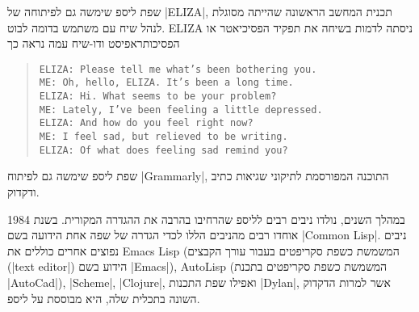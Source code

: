 שפת ליספ שימשה גם לפיתוחה של \E|ELIZA|, תכנית המחשב הראשונה שהייתה מסוגלת לנהל
שיח עם משתמש בדומה לבוט. ELIZA ניסתה לדמות בשיחה את תפקיד הפסיכיאטר או
הפסיכותראפיסט ודו-שיח עמה נראה כך

\begin{quote}
  \begin{minipage}{0.8\textwidth}
  \begin{LTR}
    \scriptsize
    \begin{verbatim}
ELIZA: Please tell me what’s been bothering you.
ME: Oh, hello, ELIZA. It’s been a long time.
ELIZA: Hi. What seems to be your problem?
ME: Lately, I’ve been feeling a little depressed.
ELIZA: And how do you feel right now?
ME: I feel sad, but relieved to be writing.
ELIZA: Of what does feeling sad remind you?
\end{verbatim}
  \end{LTR}
\end{minipage}
\end{quote}
שפת ליספ שימשה גם לפיתוח \E|Grammarly|, התוכנה המפורסמת לתיקוני שגיאות כתיב
ודקדוק.

במהלך השנים, נולדו ניבים רבים לליספ שהרחיבו בהרבה את ההגדרה המקורית. בשנת 1984
אוחדו רבים מהניבים הללו לכדי הגדרה של שפה אחת הידועה בשם \E|Common Lisp|. ניבים
נפוצים אחרים כוללים את Emacs Lisp (המשמשת כשפת סקריפטים בעבור עורך הקבצים
(\E|text editor|) הידוע בשם \E|Emacs|), AutoLisp (המשמשת כשפת סקריפטים בתכנת
\E|AutoCad|), \E|Scheme|, \E|Clojure|, ואפילו שפת התכנות \E|Dylan|, אשר למרות
הדקדוק השונה בתכלית שלה, היא מבוססת על ליספ.

